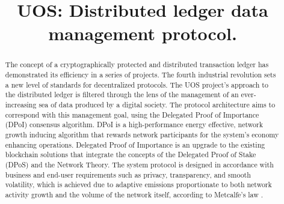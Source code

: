 \documentclass[a4paper,12pt]{article}
\title{UOS: Distributed ledger data management protocol.}
\author{}
\begin{document}
\maketitle

\begin{abstract}

The concept of a cryptographically protected and distributed transaction ledger has demonstrated its efficiency in a series of projects. The fourth industrial revolution sets a new level of standards for decentralized protocols. The UOS project’s approach to the distributed ledger is filtered through the lens of the management of an ever-increasing sea of data produced by a digital society. The protocol architecture aims to correspond with this management  goal, using the Delegated Proof of Importance (DPoI) consensus algorithm. DPoI is a high-performance energy effective, network growth inducing algorithm that rewards network participants for the system's economy enhancing operations. Delegated Proof of Importance is an upgrade to the existing blockchain solutions that integrate the concepts of the Delegated Proof of Stake (DPoS) and the Network Theory. The system protocol is designed in accordance with business and end-user requirements such as privacy, transparency, and smooth volatility, which is achieved due to adaptive emissions proportionate to both network activity growth and the volume of the network itself, according to Metcalfe's law \cite{Metcalfe}.

\end{abstract}
\end{document}
